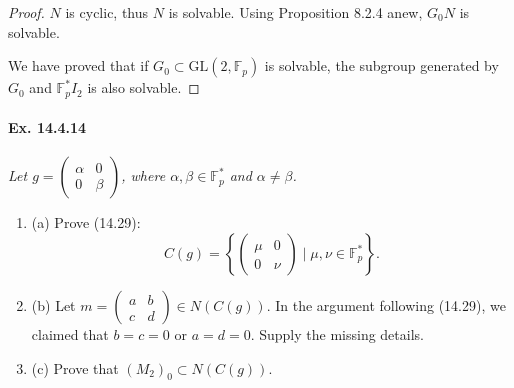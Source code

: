\documentclass[11pt,a4paper]{article}
\newcommand{\be} {\begin{enumerate}}
\newcommand{\ee} {\end{enumerate}}
\newcommand{\F}{\mathbb{F}}
\begin{document}
{\begin{proof}
$N$ is cyclic, thus $N$ is solvable. Using Proposition 8.2.4 anew, $G_0N$ is solvable.

We have proved that if $G_0 \subset \mathrm{GL}(2,\F_p)$ is solvable, the subgroup generated by $G_0$ and $\F_p^* I_2$ is also solvable.
\end{proof}

\paragraph{Ex. 14.4.14}{\it Let $g = \begin{pmatrix} \alpha & 0 \\ 0 & \beta \end{pmatrix}$, where $\alpha, \beta \in \F_p^*$ and $\alpha \ne \beta$.
\be
\item[(a)] Prove (14.29):
$$C(g) = \left\{ \begin{pmatrix} \mu & 0 \\ 0 & \nu \end{pmatrix} \mid \mu,\nu \in \F_p^*\right\}.$$
\item[(b)] Let $m =  \begin{pmatrix} a & b \\ c & d \end{pmatrix} \in N(C(g))$. In the argument following (14.29), we claimed that $b=c=0$ or $a=d=0$. Supply the missing details.
\item[(c)] Prove that $(M_2)_0 \subset N(C(g))$.
\ee
}

}
\end{document}
